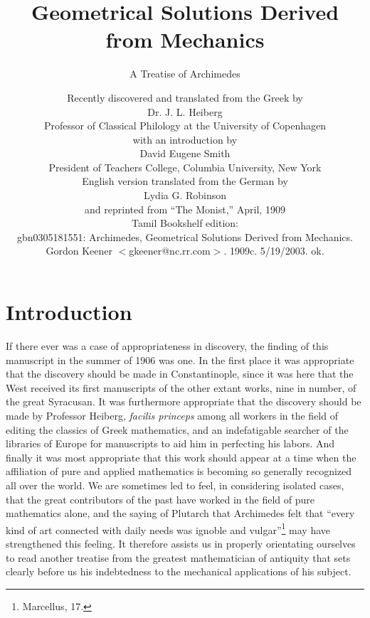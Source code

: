 \documentclass[12pt]{article}
\title{Geometrical Solutions Derived from Mechanics}
\author{A Treatise of Archimedes}
\date{\vspace{\baselineskip}
{\small Recently discovered and translated from the Greek
by}\\ Dr. J. L. Heiberg\\ {\small Professor of Classical Philology at
the University of Copenhagen}\\
\vspace{\baselineskip} {\small with an introduction by}\\ David Eugene
Smith\\ {\small President of Teachers College, Columbia University, New York}\\
\vspace{\baselineskip}
{\small English version translated from the German by}\\ Lydia
G. Robinson\\ {\small and reprinted from ``The Monist,'' April,
1909}\\
\vspace{\baselineskip}
{\small Tamil Bookshelf edition:\\
gbn0305181551: Archimedes, Geometrical Solutions Derived from Mechanics.
Gordon Keener $<$gkeener@nc.rr.com$>$.  1909c.  5/19/2003.  ok.}
}
\begin{document}
\maketitle


\vfill\pagebreak

\section*{Introduction}

If there ever was a case of appropriateness in discovery, the finding
of this manuscript in the summer of 1906 was one. In the first place
it was appropriate that the discovery should be made in
Constantinople, since it was here that the West received its first
manuscripts of the other extant works, nine in number, of the great
Syracusan. It was furthermore appropriate that the discovery should be
made by Professor Heiberg, \emph{facilis princeps} among all workers
in the field of editing the classics of Greek mathematics, and an
indefatigable searcher of the libraries of Europe for manuscripts to
aid him in perfecting his labors.  And finally it was most appropriate
that this work should appear at a time when the affiliation of pure
and applied mathematics is becoming so generally recognized all over
the world. We are sometimes led to feel, in considering isolated
cases, that the great contributors of the past have worked in the
field of pure mathematics alone, and the saying of Plutarch that
Archimedes felt that ``every kind of art connected with daily needs
was ignoble and vulgar''\footnote{Marcellus, 17.} may have
strengthened this feeling. It therefore assists us in properly
orientating ourselves to read another treatise from the greatest
mathematician of antiquity that sets clearly before us his
indebtedness to the mechanical applications of his subject.
\end{document}
